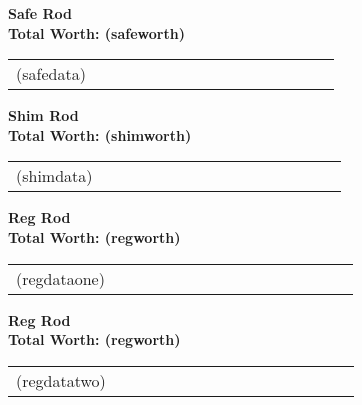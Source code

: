 \documentclass{article}
\begin{document}
\small
\centering
{\large\bf Safe Rod\\Total Worth: (safeworth)}

\begin{tabular}{|*{8}{rr|}}
(safedata)
\end{tabular}
\clearpage
{\large\bf Shim Rod\\Total Worth: (shimworth)}

\begin{tabular}{|*{8}{rr|}}
(shimdata)
\end{tabular}
\clearpage
{\large\bf Reg Rod\\Total Worth: (regworth)}

\begin{tabular}{|*{8}{rr|}}
(regdataone)
\end{tabular}
\clearpage
{\large\bf Reg Rod\\Total Worth: (regworth)}

\begin{tabular}{|*{8}{rr|}}
(regdatatwo)
\end{tabular}
\end{document}
